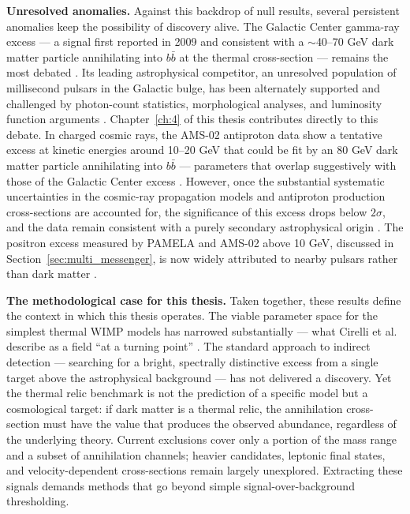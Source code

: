 \textbf{Unresolved anomalies.}
Against this backdrop of null results, several persistent anomalies keep the possibility of discovery alive.
The Galactic Center gamma-ray excess --- a signal first reported in 2009 and consistent with a $\sim$40--70 GeV dark matter particle annihilating into $b\bar{b}$ at the thermal cross-section --- remains the most debated \cite{Daylan:2014rsa,Cirelli:2024ssz,Hooper:2024}.
Its leading astrophysical competitor, an unresolved population of millisecond pulsars in the Galactic bulge, has been alternately supported and challenged by photon-count statistics, morphological analyses, and luminosity function arguments \cite{Cirelli:2024ssz}.
Chapter~\ref{ch:4} of this thesis contributes directly to this debate.
In charged cosmic rays, the AMS-02 antiproton data show a tentative excess at kinetic energies around 10--20 GeV that could be fit by an 80 GeV dark matter particle annihilating into $b\bar{b}$ --- parameters that overlap suggestively with those of the Galactic Center excess \cite{Cirelli:2024ssz}.
However, once the substantial systematic uncertainties in the cosmic-ray propagation models and antiproton production cross-sections are accounted for, the significance of this excess drops below $2\sigma$, and the data remain consistent with a purely secondary astrophysical origin \cite{Cirelli:2024ssz}.
The positron excess measured by PAMELA and AMS-02 above 10 GeV, discussed in Section~\ref{sec:multi_messenger}, is now widely attributed to nearby pulsars rather than dark matter \cite{Cirelli:2024ssz,Hooper:2024}.

\textbf{The methodological case for this thesis.}
Taken together, these results define the context in which this thesis operates.
The viable parameter space for the simplest thermal WIMP models has narrowed substantially --- what Cirelli et al.
describe as a field ``at a turning point'' \cite{Cirelli:2024ssz}.
The standard approach to indirect detection --- searching for a bright, spectrally distinctive excess from a single target above the astrophysical background --- has not delivered a discovery.
Yet the thermal relic benchmark is not the prediction of a specific model but a cosmological target: if dark matter is a thermal relic, the annihilation cross-section must have the value that produces the observed abundance, regardless of the underlying theory.
Current exclusions cover only a portion of the mass range and a subset of annihilation channels; heavier candidates, leptonic final states, and velocity-dependent cross-sections remain largely unexplored.
Extracting these signals demands methods that go beyond simple signal-over-background thresholding.

